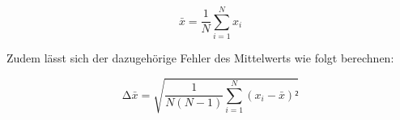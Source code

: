 \begin{equation}
\label{eqn:Mittelwert}
    \bar{x} = \frac{1}{N}\sum_{i=1}^N x_i
\end{equation}

Zudem lässt sich der dazugehörige Fehler des Mittelwerts wie folgt berechnen:

\begin{equation}
\label{eqn:Mittelwertfehler}
    \increment \bar{x} = \sqrt{\frac{1}{N\left(N-1\right)}\sum_{i=1}^N \left(x_i - \bar{x}\right)²}
\end{equation}



